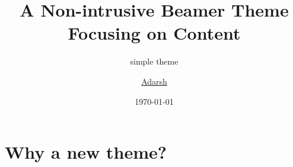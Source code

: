 \documentclass[xetex, aspectratio=169]{beamer}
\title{A Non-intrusive Beamer Theme Focusing on Content}
\subtitle{simple theme}
\date{\today}
\author{\underline{Adarsh}}
\begin{document}
\begin{frame}
\maketitle
\end{frame}


\section{Why a new theme?}
\end{document}

